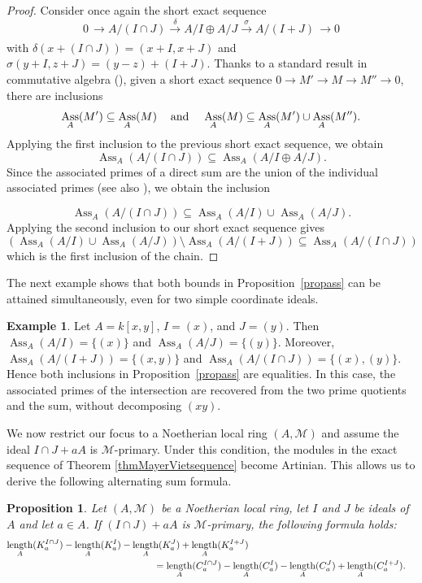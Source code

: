 \documentclass[11pt,leqno]{amsart}
\newcommand{\aar}[2][]{\xrightarrow[#1]{#2}}
\newtheorem{proposition}[theorem]{Proposition}
\theoremstyle{definition}
\newtheorem{example}[theorem]{Example}
\numberwithin{equation}{section}
\DeclareMathOperator{\Ass}{Ass}
\DeclareMathOperator{\length}{length}
\begin{document}
\begin{proof}
    Consider once again the short exact sequence 
    $$0\, \aar{} A/(I\cap J) \aar{\delta} {A/I \oplus A/J} \aar{\sigma} A/(I+J)\, \aar{} 0$$
    with $\delta(x+(I\cap J))=(x+I, x+J)$ and $\sigma (y+I,z+J)=(y-z)+(I+J)$. 
Thanks to a standard result in commutative algebra (\cite[Theorem~6.3, p.~38]{Mat86}), given a short exact sequence $0 \to M' \to M \to M'' \to 0$, there are inclusions $$\Ass_A(M') \subseteq \Ass_A(M) \hspace{2ex} \text{ and } \hspace{2ex}\Ass_A(M) \subseteq \Ass_A(M') \cup \Ass_A(M'').$$ Applying the first inclusion to the previous short exact sequence, we obtain $$\Ass_A \left( A/(I\cap J)\right) \subseteq \Ass_A\left(A/I \oplus A/J\right).$$
Since the associated primes of a direct sum are the union of the individual associated primes (see also \cite[Theorem~6.3, p.~38]{Mat86}), we obtain the inclusion

$$\Ass_A(A/(I\cap J))
\subseteq\Ass_A(A/I)\cup\Ass_A(A/J).$$
Applying the second inclusion to our short exact sequence gives
$$\left( \Ass_A\left(A/I\right) \cup \Ass_A\left(A/J\right) \right) \setminus \Ass_A\left(A/(I+J)\right) \subseteq \Ass_A\left(A/(I \cap J)\right)$$
which is the first inclusion of the chain.
\end{proof}

The next example shows that both bounds in Proposition~\ref{propass} can be attained simultaneously, even for two simple coordinate ideals.

\begin{example}
Let $A=k[x,y]$, $I=(x)$, and $J=(y)$. Then $\Ass_A(A/I)=\{(x)\}$ and $\Ass_A(A/J)=\{(y)\}$. Moreover,
$\Ass_A(A/(I+J))=\{(x,y)\}$ and $\Ass_A(A/(I\cap J))=\{(x),(y)\}$. Hence both inclusions in Proposition~\ref{propass} are equalities. In this case, the associated primes of the intersection are recovered from the two prime quotients and the sum, without decomposing $(xy)$.
\end{example}

We now restrict our focus to a Noetherian local ring $(A, \mathcal{M})$ and assume the ideal $I \cap J + aA$ is $\mathcal{M}$-primary. Under this condition, the modules in the exact sequence of Theorem \ref{thmMayerVietsequence} become Artinian. This allows us to derive the following alternating sum formula.

\begin{proposition}
\label{propformula}
Let $(A,\mathcal{M})$ be a Noetherian local ring, let $I$ and $J$ be ideals of $A$ and let $a\in A$. If $(I\cap J)+aA$ is $\mathcal{M}$-primary, the following formula holds:
\begin{align*}
\length_A (K^{I \cap J}_a)
-\length_A (K^{I}_a)
-\length_A (K^{J}_a)
+\length_A (K^{I+J}_a)\\
&\hspace{-10em}=
\length_A (C^{I \cap J}_a)
-\length_A (C^{I}_a)
-\length_A (C^{J}_a)
+\length_A (C^{I+J}_a).	
\end{align*}
\end{proposition}
\end{document}
